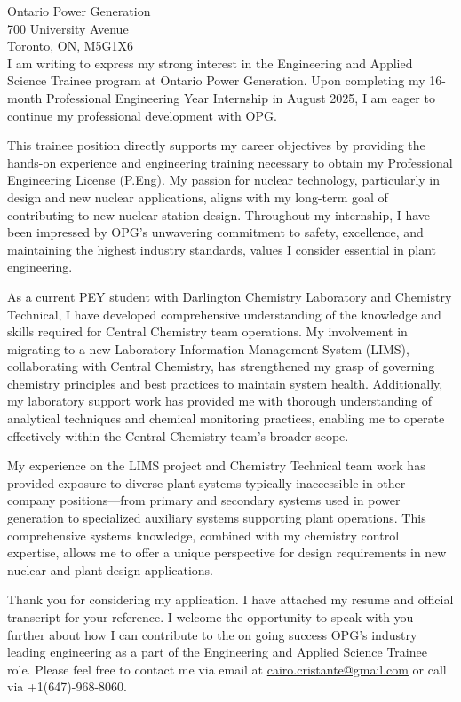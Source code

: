 \documentclass[11pt]{FDUletter}
\begin{document}
\begin{letter}{
    Ontario Power Generation \\
    700 University Avenue\\
    Toronto, ON, M5G1X6 \\
}
I am writing to express my strong interest in the Engineering and Applied Science Trainee program at Ontario Power Generation. Upon completing my 16-month Professional Engineering Year Internship in August 2025, I am eager to continue my professional development with OPG.

This trainee position directly supports my career objectives by providing the hands-on experience and engineering training necessary to obtain my Professional Engineering License (P.Eng). My passion for nuclear technology, particularly in design and new nuclear applications, aligns with my long-term goal of contributing to new nuclear station design. Throughout my internship, I have been impressed by OPG's unwavering commitment to safety, excellence, and maintaining the highest industry standards, values I consider essential in plant engineering.

As a current PEY student with Darlington Chemistry Laboratory and Chemistry Technical, I have developed comprehensive understanding of the knowledge and skills required for Central Chemistry team operations. My involvement in migrating to a new Laboratory Information Management System (LIMS), collaborating with Central Chemistry, has strengthened my grasp of governing chemistry principles and best practices to maintain system health. Additionally, my laboratory support work has provided me with thorough understanding of analytical techniques and chemical monitoring practices, enabling me to operate effectively within the Central Chemistry team's broader scope.

My experience on the LIMS project and Chemistry Technical team work has provided exposure to diverse plant systems typically inaccessible in other company positions—from primary and secondary systems used in power generation to specialized auxiliary systems supporting plant operations. This comprehensive systems knowledge, combined with my chemistry control expertise, allows me to offer a unique perspective for design requirements in new nuclear and plant design applications.

Thank you for considering my application. I have attached my resume and official transcript for your reference. I welcome the opportunity to speak with you further about how I can contribute to the on going success OPG's industry leading engineering as a part of the Engineering and Applied Science Trainee role. Please feel free to contact me via email at \href{mailto:cairo.cristante@gmail.com}{cairo.cristante@gmail.com} or call via +1(647)-968-8060.



\end{letter}
\end{document}
